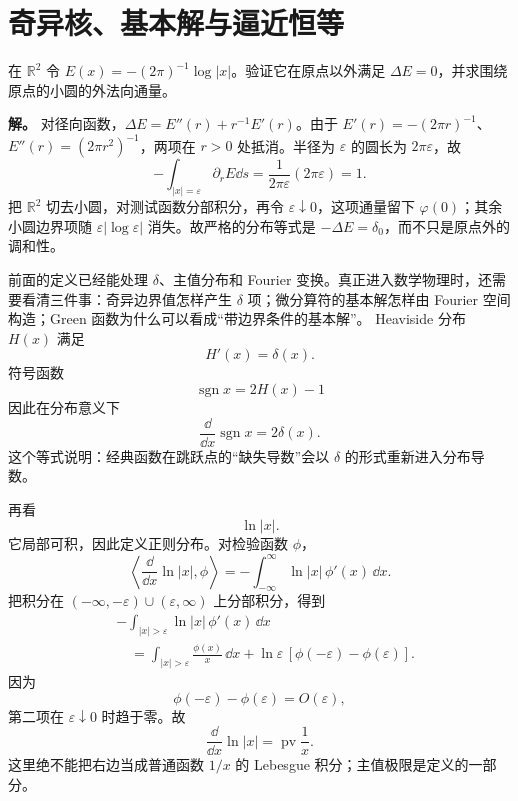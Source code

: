 \section{奇异核、基本解与逼近恒等}

\begin{workedexample}
在 \(\mathbb R^2\) 令 \(E(x)=-(2\pi)^{-1}\log|x|\)。验证它在原点以外满足 \(\Delta E=0\)，并求围绕原点的小圆的外法向通量。

\textbf{解。} 对径向函数，\(\Delta E=E''(r)+r^{-1}E'(r)\)。由于 \(E'(r)=-(2\pi r)^{-1}\)、\(E''(r)=(2\pi r^2)^{-1}\)，两项在 \(r>0\) 处抵消。半径为 \(\varepsilon\) 的圆长为 \(2\pi\varepsilon\)，故
\[
-\int_{|x|=\varepsilon}\partial_rE\dd s
=\frac1{2\pi\varepsilon}(2\pi\varepsilon)=1.
\]
把 \(\mathbb R^2\) 切去小圆，对测试函数分部积分，再令 \(\varepsilon\downarrow0\)，这项通量留下 \(\varphi(0)\)；其余小圆边界项随 \(\varepsilon|\log\varepsilon|\) 消失。故严格的分布等式是 \(-\Delta E=\delta_0\)，而不只是原点外的调和性。
\end{workedexample}


前面的定义已经能处理 $\delta$、主值分布和 Fourier 变换。真正进入数学物理时，还需要看清三件事：奇异边界值怎样产生 $\delta$ 项；微分算符的基本解怎样由 Fourier 空间构造；Green 函数为什么可以看成“带边界条件的基本解”。
Heaviside 分布 $H(x)$ 满足
\[
H'(x)=\delta(x).
\]
符号函数
\[
\operatorname{sgn}x=2H(x)-1
\]
因此在分布意义下
\[
\boxed{
\frac{\dd}{\dd x}\operatorname{sgn}x=2\delta(x)
}.
\]
这个等式说明：经典函数在跳跃点的“缺失导数”会以 $\delta$ 的形式重新进入分布导数。

再看
\[
\ln|x|.
\]
它局部可积，因此定义正则分布。对检验函数 $\phi$，
\[
\left\langle \frac{\dd}{\dd x}\ln|x|,\phi\right\rangle
=-\int_{-\infty}^{\infty}\ln|x|\,\phi'(x)\,\dd x.
\]
把积分在 $( -\infty,-\varepsilon)\cup(\varepsilon,\infty)$ 上分部积分，得到
\[
\begin{aligned}
&-\int_{|x|>\varepsilon}\ln|x|\,\phi'(x)\,\dd x\\
&\quad=\int_{|x|>\varepsilon}\frac{\phi(x)}{x}\,\dd x
+\ln\varepsilon\,[\phi(-\varepsilon)-\phi(\varepsilon)].
\end{aligned}
\]
因为
\[
\phi(-\varepsilon)-\phi(\varepsilon)=O(\varepsilon),
\]
第二项在 $\varepsilon\downarrow0$ 时趋于零。故
\begin{equation*}\boxed{
\frac{\dd}{\dd x}\ln|x|
=\operatorname{pv}\frac1x
}.\end{equation*}
这里绝不能把右边当成普通函数 $1/x$ 的 Lebesgue 积分；主值极限是定义的一部分。


